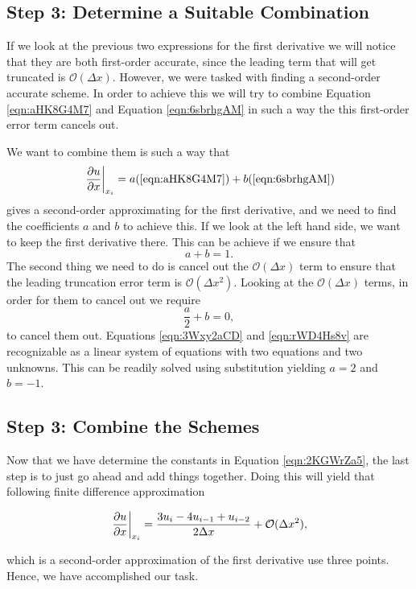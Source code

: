 \subsection{Step 3: Determine a Suitable Combination}
If we look at the previous two expressions for the first derivative we will notice that they are both first-order accurate, since the leading term that will get truncated is $\mathcal{O}(\Delta x)$. However, we were tasked with finding a second-order accurate scheme. In order to achieve this we will try to combine Equation \ref{eqn:aHK8G4M7} and Equation \ref{eqn:6sbrhgAM} in such a way the this first-order error term cancels out.

We want to combine them is such a way that
\begin{equation}
	\left.\frac{\partial u}{\partial x}\right\rvert_{x_i}^{} = a(\ref{eqn:aHK8G4M7}) + b(\ref{eqn:6sbrhgAM})
	\label{eqn:2KGWrZa5}
\end{equation}
gives a second-order approximating for the first derivative, and we need to find the coefficients $a$ and $b$ to achieve this. If we look at the left hand side, we want to keep the first derivative there. This can be achieve if we ensure that
\begin{equation}
	a + b = 1.
	\label{eqn:3Wxy2aCD}
\end{equation}
The second thing we need to do is cancel out the $\mathcal{O}(\Delta x)$ term to ensure that the leading truncation error term is $\mathcal{O}(\Delta x^2)$. Looking at the $\mathcal{O}(\Delta x)$ terms, in order for them to cancel out we require
\begin{equation}
	\frac{a}{2} + b = 0,
	\label{eqn:rWD4Hs8v}
\end{equation}
to cancel them out. Equations \ref{eqn:3Wxy2aCD} and \ref{eqn:rWD4Hs8v} are recognizable as a linear system of equations with two equations and two unknowns. This can be readily solved using substitution yielding $a=2$ and $b=-1$.

\subsection{Step 3: Combine the Schemes}
Now that we have determine the constants in Equation \ref{eqn:2KGWrZa5}, the last step is to just go ahead and add things together. Doing this will yield that following finite difference approximation
\begin{eqBox}
\begin{equation}
	\left.\frac{\partial u}{\partial x}\right\rvert_{x_i}^{} = \frac{3u_i - 4u_{i-1} + u_{i-2}}{2 \Delta x} + \mathcal{O}(\Delta x^2),
	\label{eqn:aHK8G4M7}
\end{equation}
\end{eqBox}
which is a second-order approximation of the first derivative use three points. Hence, we have accomplished our task.

